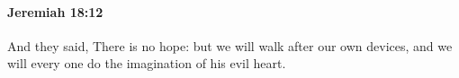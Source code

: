 
		\paragraph{Jeremiah 18:12} %
			\label{JEREMIAH-18-12}

			And they said, There is no hope: but we will walk after our own devices, and we will every one do the imagination of his evil heart.


